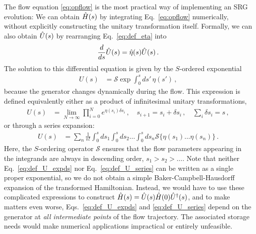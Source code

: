 {The flow equation \eqref{eq:opflow} is the most practical way of implementing
an SRG evolution: We can obtain $\hat{H}(s)$ by integrating Eq.~\eqref{eq:opflow} 
numerically, without explicitly constructing the unitary transformation itself. 
Formally, we can also obtain $\hat{U}(s)$ by rearranging Eq.~\eqref{eq:def_eta} into
\begin{equation}\label{eq:Uflow}
  \totd{}{s}\UO(s) = \etaO(s)\UO(s)\,.
\end{equation}
The solution to this differential equation is given by the $S$-ordered 
exponential
\begin{align}
  U(s) &= \mathcal{S}\exp \int^s_0 ds'\,\eta(s') \label{eq:def_U_pathexp}\,,
\end{align}
because the generator changes dynamically during the flow. This expression
is defined equivalently either as a product of infinitesimal unitary transformations,
\begin{align}       \label{eq:def_U_expds}
   U(s) &= \lim_{N\to\infty}\prod^{N}_{i=0} e^{\eta(s_i)\delta s_i}\,,\quad s_{i+1}=s_i+\delta s_i\,,\quad \sum_{i}\delta s_i=s\,,
\end{align}
or through a series expansion:
\begin{align}     \label{eq:def_U_series}
   U(s) &= \sum_n \frac{1}{n!}\int^s_0 ds_1 \int^s_0 ds_2 \ldots 
          \int^s_0 ds_n \mathcal{S}\{\eta(s_1)\ldots\eta(s_n)\}\,.
\end{align}
Here, the $S$-ordering operator $\mathcal{S}$ ensures that the flow parameters 
appearing in the integrands are always in descending order,
$s_1 > s_2 > \ldots$. Note that neither Eq.~\eqref{eq:def_U_expds} nor Eq.~\eqref{eq:def_U_series} 
can be written as a single proper exponential, so we do not obtain
a simple Baker-Campbell-Hausdorff expansion of the transformed
Hamiltonian. Instead, we would have to use these complicated expressions 
to construct $\hat{H}(s)=\hat{U}(s)\hat{H}(0)\hat{U}^\dag(s)$, and to make matters even worse, Eqs.~\eqref{eq:def_U_expds}
and \eqref{eq:def_U_series} depend on the generator at \emph{all intermediate points} 
of the flow trajectory. The associated storage needs would make numerical applications
impractical or entirely unfeasible.

}
